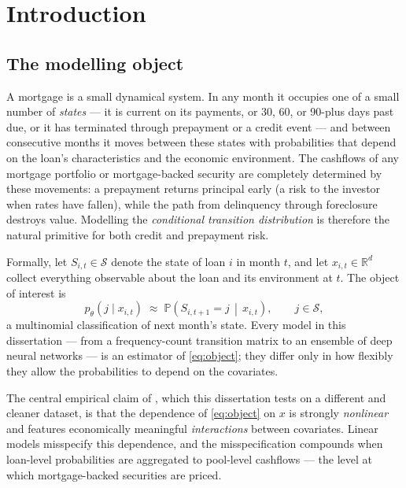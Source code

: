 
\chapter{Introduction}
\label{chap:intro}

\section{The modelling object}
\label{sec:intro-object}

A mortgage is a small dynamical system.  In any month it occupies one
of a small number of \emph{states} --- it is current on its payments,
or 30, 60, or 90-plus days past due, or it has terminated through
prepayment or a credit event --- and between consecutive months it
moves between these states with probabilities that depend on the
loan's characteristics and the economic environment.  The cashflows
of any mortgage portfolio or mortgage-backed security are completely
determined by these movements: a prepayment returns principal early
(a risk to the investor when rates have fallen), while the path from
delinquency through foreclosure destroys value.  Modelling the
\emph{conditional transition distribution} is therefore the natural
primitive for both credit and prepayment risk.

Formally, let $S_{i,t}\in\mathcal{S}$ denote the state of loan $i$ in
month $t$, and let $x_{i,t}\in\mathbb{R}^{d}$ collect everything
observable about the loan and its environment at $t$.  The object of
interest is
\begin{equation}
\label{eq:object}
p_\theta\!\left(j \mid x_{i,t}\right) \;\approx\;
\mathbb{P}\!\left(S_{i,t+1}=j \,\middle|\, x_{i,t}\right),
\qquad j\in\mathcal{S},
\end{equation}
a multinomial classification of next month's state.  Every model in
this dissertation --- from a frequency-count transition matrix to an
ensemble of deep neural networks --- is an estimator of
\eqref{eq:object}; they differ only in how flexibly they allow the
probabilities to depend on the covariates.

The central empirical claim of \citet{sirignano2021}, which this
dissertation tests on a different and cleaner dataset, is that the
dependence of \eqref{eq:object} on $x$ is strongly \emph{nonlinear}
and features economically meaningful \emph{interactions} between
covariates.  Linear models misspecify this dependence, and the
misspecification compounds when loan-level probabilities are
aggregated to pool-level cashflows --- the level at which
mortgage-backed securities are priced.

